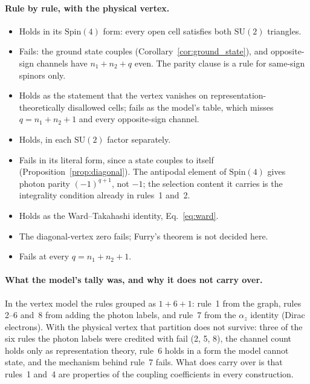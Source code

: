 \documentclass[11pt]{article}
\begin{document}
\paragraph{Rule by rule, with the physical vertex.}
\begin{itemize}
\item[(1)] Holds in its $\mathrm{Spin}(4)$ form: every open cell satisfies
  both $\mathrm{SU}(2)$ triangles.
\item[(2)] Fails: the ground state couples (Corollary~\ref{cor:ground_state}),
  and opposite-sign channels have $n_1 + n_2 + q$ even.  The parity
  clause is a rule for same-sign spinors only.
\item[(3)] Holds as the statement that the vertex vanishes on
  representation-theoretically disallowed cells; fails as the model's
  table, which misses $q = n_1 + n_2 + 1$ and every opposite-sign channel.
\item[(4)] Holds, in each $\mathrm{SU}(2)$ factor separately.
\item[(5)] Fails in its literal form, since a state couples to itself
  (Proposition~\ref{prop:diagonal}).  The antipodal element of
  $\mathrm{Spin}(4)$ gives photon parity $(-1)^{q+1}$, not $-1$; the
  selection content it carries is the integrality condition already in
  rules~1 and~2.
\item[(6)] Holds as the Ward--Takahashi identity, Eq.~\eqref{eq:ward}.
\item[(7)] The diagonal-vertex zero fails; Furry's theorem is not
  decided here.
\item[(8)] Fails at every $q = n_1 + n_2 + 1$.
\end{itemize}

\paragraph{What the model's tally was, and why it does not carry over.}
In the vertex model the rules grouped as $1{+}6{+}1$: rule~1 from the
graph, rules 2--6 and~8 from adding the photon labels, and rule~7 from
the $\alpha_z$ identity (Dirac electrons).  With the physical vertex
that partition does not survive: three of the six rules the photon
labels were credited with fail (2, 5, 8), the channel count holds only
as representation theory, rule~6 holds in a form the model cannot
state, and the mechanism behind rule~7 fails.  What does carry over is
that rules~1 and~4 are properties of the coupling coefficients in every
construction.

\end{document}

